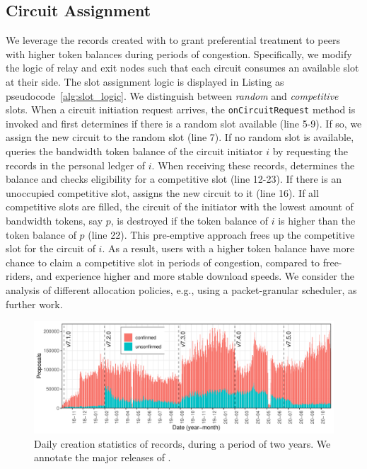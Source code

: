 \subsection{Circuit Assignment}
We leverage the records created with \ModelName{} to grant preferential treatment to peers with higher token balances during periods of congestion.
Specifically, we modify the logic of relay and exit nodes such that each circuit consumes an available slot at their side.
The slot assignment logic is displayed in Listing as pseudocode~\ref{alg:slot_logic}.
We distinguish between \emph{random} and \emph{competitive} slots.
When a circuit initiation request arrives, the \texttt{onCircuitRequest} method is invoked and \Tribler{} first determines if there is a random slot available (line 5-9).
If so, we assign the new circuit to the random slot (line 7).
If no random slot is available, \Tribler{} queries the bandwidth token balance of the circuit initiator $ i $ by requesting the records in the personal ledger of $ i $.
When receiving these records, \Tribler{} determines the balance and checks eligibility for a competitive slot (line 12-23).
If there is an unoccupied competitive slot, \Tribler{} assigns the new circuit to it (line 16).
If all competitive slots are filled, the circuit of the initiator with the lowest amount of bandwidth tokens, say $ p $, is destroyed if the token balance of $ i $ is higher than the token balance of $ p $ (line 22).
This pre-emptive approach frees up the competitive slot for the circuit of $ i $.
As a result, users with a higher token balance have more chance to claim a competitive slot in periods of congestion, compared to free-riders, and experience higher and more stable download speeds.
We consider the analysis of different allocation policies, e.g., using a packet-granular scheduler, as further work.


\begin{figure}[!t]
	\centering
	\includegraphics[width=\linewidth]{trustchain/assets/record_creation}
	\caption{Daily creation statistics of records, during a period of two years. We annotate the major releases of \Tribler{}.}
	\label{fig:record_creation}
\end{figure}

